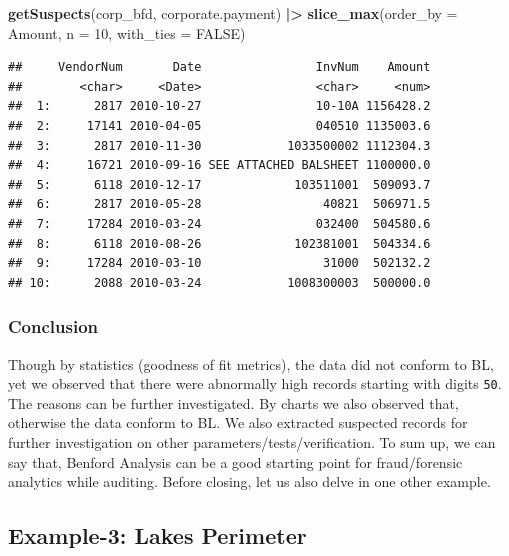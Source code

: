 \documentclass[
]{book}
\newenvironment{Shaded}{\begin{snugshade}}{\end{snugshade}}
\newcommand{\AttributeTok}[1]{\textcolor[rgb]{0.13,0.29,0.53}{#1}}
\newcommand{\ConstantTok}[1]{\textcolor[rgb]{0.56,0.35,0.01}{#1}}
\newcommand{\DecValTok}[1]{\textcolor[rgb]{0.00,0.00,0.81}{#1}}
\newcommand{\FunctionTok}[1]{\textcolor[rgb]{0.13,0.29,0.53}{\textbf{#1}}}
\newcommand{\NormalTok}[1]{#1}
\newcommand{\SpecialCharTok}[1]{\textcolor[rgb]{0.81,0.36,0.00}{\textbf{#1}}}
\begin{document}
\begin{Shaded}
\begin{Highlighting}[]
\FunctionTok{getSuspects}\NormalTok{(corp\_bfd, corporate.payment) }\SpecialCharTok{|\textgreater{}}
  \FunctionTok{slice\_max}\NormalTok{(}\AttributeTok{order\_by =}\NormalTok{ Amount, }\AttributeTok{n =} \DecValTok{10}\NormalTok{, }\AttributeTok{with\_ties =} \ConstantTok{FALSE}\NormalTok{)}
\end{Highlighting}
\end{Shaded}

\begin{verbatim}
##     VendorNum       Date                InvNum    Amount
##        <char>     <Date>                <char>     <num>
##  1:      2817 2010-10-27                10-10A 1156428.2
##  2:     17141 2010-04-05                040510 1135003.6
##  3:      2817 2010-11-30            1033500002 1112304.3
##  4:     16721 2010-09-16 SEE ATTACHED BALSHEET 1100000.0
##  5:      6118 2010-12-17             103511001  509093.7
##  6:      2817 2010-05-28                 40821  506971.5
##  7:     17284 2010-03-24                032400  504580.6
##  8:      6118 2010-08-26             102381001  504334.6
##  9:     17284 2010-03-10                 31000  502132.2
## 10:      2088 2010-03-24            1008300003  500000.0
\end{verbatim}

\hypertarget{conclusion}{%
\subsubsection*{Conclusion}\label{conclusion}}

Though by statistics (goodness of fit metrics), the data did not conform to BL, yet we observed that there were abnormally high records starting with digits \texttt{50}. The reasons can be further investigated. By charts we also observed that, otherwise the data conform to BL. We also extracted suspected records for further investigation on other parameters/tests/verification. To sum up, we can say that, Benford Analysis can be a good starting point for fraud/forensic analytics while auditing. Before closing, let us also delve in one other example.

\hypertarget{example-3-lakes-perimeter}{%
\subsection{Example-3: Lakes Perimeter}\label{example-3-lakes-perimeter}}
\end{document}
